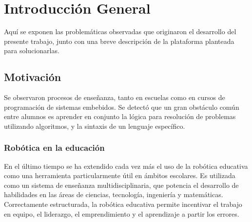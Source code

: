 
\chapter{Introducción General} %

\label{Chapter1} %
\label{IntroGeneral}


\newcommand{\keyword}[1]{\textbf{#1}}
\newcommand{\tabhead}[1]{\textbf{#1}}
\newcommand{\code}[1]{\texttt{#1}}
\newcommand{\file}[1]{\texttt{\bfseries#1}}
\newcommand{\option}[1]{\texttt{\itshape#1}}
\newcommand{\grados}{$^{\circ}$}



Aquí se exponen las problemáticas observadas que originaron el desarrollo del presente trabajo, junto con una breve descripción de la plataforma planteada para solucionarlas.
\section{Motivación}
Se observaron procesos de enseñanza, tanto en escuelas como en cursos de programación de sistemas embebidos. Se detectó que un gran obstáculo común entre alumnos es aprender en conjunto la lógica para resolución de problemas utilizando algoritmos, y la sintaxis de un lenguaje específico.
\subsection{Robótica en la educación}
En el último tiempo se ha extendido cada vez más el uso de la robótica educativa como una herramienta particularmente útil en ámbitos escolares. Es utilizada como un sistema de enseñanza multidisciplinaria, que potencia el desarrollo de habilidades en las áreas de ciencias, tecnología, ingeniería y matemáticas. Correctamente estructurada, la robótica educativa permite incentivar el trabajo en equipo, el liderazgo, el emprendimiento y el aprendizaje a partir los errores.

